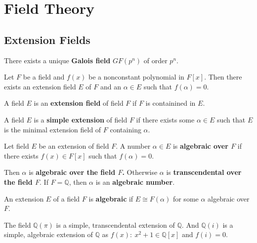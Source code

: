 \chapter{Field Theory}

\section{Extension Fields}
\begin{definition}
	There exists a unique \textbf{Galois field} $GF(p^n)$ of order $p^n$.
\end{definition}

\begin{theorem}[Kronecker]
	Let $F$ be a field and $f(x)$ be a nonconstant polynomial in $F[x]$.
	Then there exists an extension field $E$ of $F$ and an $\alpha \in E$ such that $f(\alpha) = 0$.
\end{theorem}

\begin{definition}
	A field $E$ is an \textbf{extension field} of field $F$ if $F$ is containined in $E$.
\end{definition}

\begin{definition}
	A field $E$ is a \textbf{simple extension} of field $F$ if there exists some $\alpha \in E$ such that $E$ is the minimal extension field of $F$ containing $\alpha$.
\end{definition}

\begin{definition}
	Let field $E$ be an extension of field $F$.
	A number $\alpha \in E$ is \textbf{algebraic over $F$} if there exists $f(x) \in F[x]$ such that $f(\alpha) = 0$.
\end{definition}

	Then $\alpha$ is \textbf{algebraic over the field $F$.}
	Otherwise $\alpha$ is \textbf{transcendental over the field $F$}.
	If $F = \mathbb{Q}$, then $\alpha$ is an \textbf{algebraic number}.

\begin{definition}
	An extension $E$ of a field $F$ is \textbf{algebraic} if $E \cong F(\alpha)$ for some $\alpha$ algebraic over $F$.
\end{definition}
	The field $\mathbb{Q}(\pi)$ is a simple, transcendental extension of $\mathbb{Q}$.
	And $\mathbb{Q}(i)$ is a simple, algebraic extension of $\mathbb{Q}$ as $f(x):\ x^2+1 \in \mathbb{Q}[x]$ and $f(i) = 0$.

